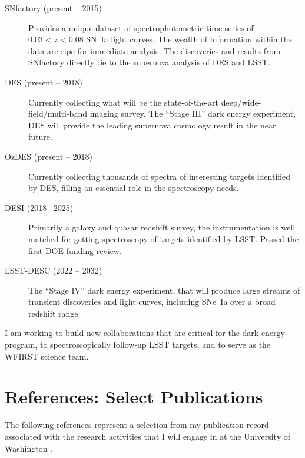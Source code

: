 \documentclass{article}
\newcommand{\where}{the University of Washington }
\newcommand{\where}{the University of Michigan }
\begin{document}
\begin{description}
\item[SNfactory (present -- 2015)]  Provides a unique dataset of
spectrophotometric time series of $0.03<z<0.08$ SN~Ia light curves.  The wealth of information
within the data are ripe for immediate analysis. The discoveries and results from SNfactory directly tie to the supernova
analysis of DES and LSST.
\item[DES (present -- 2018)] Currently collecting what will be the state-of-the-art deep/wide-field/multi-band
imaging survey.   The ``Stage III'' dark energy experiment, DES will provide the leading supernova
cosmology result in the near future.
\item[OzDES (present -- 2018)] Currently collecting thousands of spectra of interesting targets identified by DES,
filling an essential role in the spectroscopy needs.
\item[DESI (2018-- 2025)]  Primarily a galaxy and quasar redshift survey, the instrumentation is well matched for
getting spectroscopy of targets identified by LSST. Passed the first DOE funding review.
\item[LSST-DESC (2022 -- 2032)]  The ``Stage IV'' dark energy experiment, that will produce large streams of
transient discoveries and light curves, including SNe~Ia over a broad redshift range.
\end{description}

I am working to build new collaborations that are critical for the dark energy program, 
to
spectroscopically follow-up LSST targets, and to serve as the WFIRST science team.


\section{References: Select Publications}
The following references represent a selection from my publication record associated with the research
activities that I will engage in at \where.



\end{document}
